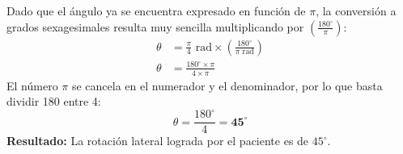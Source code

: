 \documentclass[12pt]{article}
\begin{document}
\begin{tcolorbox}
    \vspace{0.4cm}
    \begin{tcolorbox}[colback=medteal!10, colframe=medteal, arc=2mm, boxrule=1.2pt, title=\textbf{Desarrollo Matemático y Solución}]
        Dado que el ángulo ya se encuentra expresado en función de $\pi$, la conversión a grados sexagesimales resulta muy sencilla multiplicando por \textbf{$\left(\frac{180^\circ}{\pi}\right)$}:
        \begin{align*}
            \theta &= \frac{\pi}{4} \text{ rad} \times \left( \frac{180^\circ}{\pi \text{ rad}} \right) \\[1ex]
            \theta &= \frac{180^\circ \times \pi}{4 \times \pi}
        \end{align*}
        El número $\pi$ se cancela en el numerador y el denominador, por lo que basta dividir 180 entre 4:
        \[ \theta = \frac{180^\circ}{4} = \mathbf{45^\circ} \]
        \textbf{Resultado:} La rotación lateral lograda por el paciente es de \textbf{$45^\circ$}.
    \end{tcolorbox}
    
\end{tcolorbox}
\end{document}
